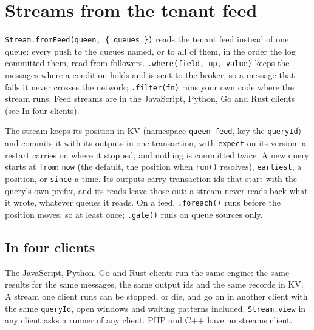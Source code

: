 
\section{Streams from the tenant feed}

\texttt{Stream.fromFeed(queen,\ \{\ queues\ \})} reads the tenant feed instead of one queue: every push to the queues named, or to all of them, in the order the log committed them, read from followers. \texttt{.where(field,\ op,\ value)} keeps the messages where a condition holds and is sent to the broker, so a message that fails it never crosses the network; \texttt{.filter(fn)} runs your own code where the stream runs. Feed streams are in the JavaScript, Python, Go and Rust clients (see In four clients).


The stream keeps its position in KV (namespace \texttt{queen-feed}, key the \texttt{queryId}) and commits it with its outputs in one transaction, with \texttt{expect} on its version: a restart carries on where it stopped, and nothing is committed twice. A new query starts at \texttt{from}: \texttt{\textquotesingle{}now\textquotesingle{}} (the default, the position when \texttt{run()} resolves), \texttt{\textquotesingle{}earliest\textquotesingle{}}, a position, or \texttt{since} a time. Its outputs carry transaction ids that start with the query's own prefix, and its reads leave those out: a stream never reads back what it wrote, whatever queues it reads. On a feed, \texttt{.foreach()} runs before the position moves, so at least once; \texttt{.gate()} runs on queue sources only.


\subsection{In four clients}

The JavaScript, Python, Go and Rust clients run the same engine: the same results for the same messages, the same output ids and the same records in KV. A stream one client runs can be stopped, or die, and go on in another client with the same \texttt{queryId}, open windows and waiting patterns included. \texttt{Stream.view} in any client asks a runner of any client. PHP and C++ have no streams client.

